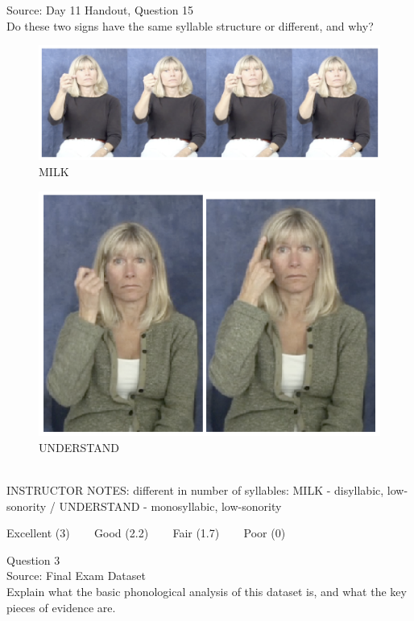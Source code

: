 \documentclass[12pt]{article}
\begin{document}
Source: Day 11 Handout, Question 15\\

Do these two signs have the same syllable structure or different, and why?\\

\begin{figure}[H]
\includegraphics{../images/asl_milk.png}
\caption{MILK}
\end{figure}
\begin{figure}[H]
\includegraphics{../images/asl_understand.png}
\caption{UNDERSTAND}
\end{figure}

~\\
INSTRUCTOR NOTES: different in number of syllables: MILK - disyllabic, low-sonority / UNDERSTAND - monosyllabic, low-sonority


\vfill
Excellent (3) ~~~ Good (2.2) ~~~ Fair (1.7) ~~~ Poor (0)
\newpage

{\large Question 3}\\

Source: Final Exam Dataset\\

Explain what the basic phonological analysis of this dataset is, and what the key pieces of evidence are.\\
\end{document}
